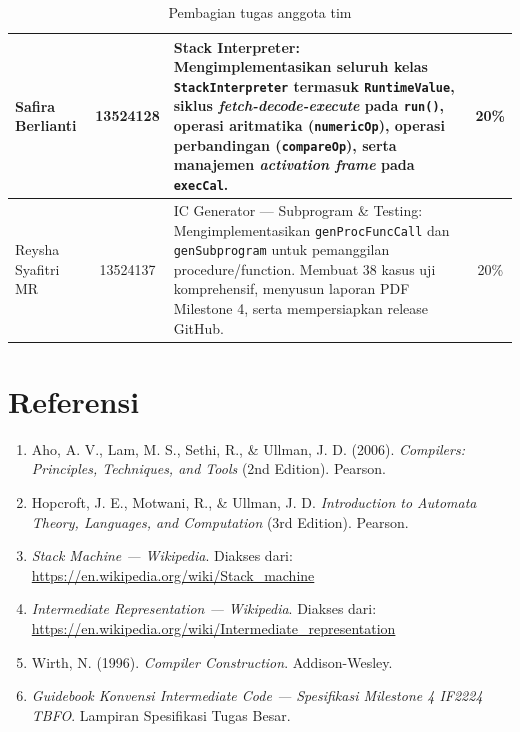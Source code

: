 \documentclass[12pt, a4paper]{article}
\begin{document}
\begin{itemize}
\begin{table}[H]
\begin{tabular}{|p{}|c|p{}|c|}
        Safira Berlianti & 13524128 & 
        Stack Interpreter: Mengimplementasikan seluruh kelas \texttt{StackInterpreter} termasuk \texttt{RuntimeValue}, siklus \textit{fetch-decode-execute} pada \texttt{run()}, operasi aritmatika (\texttt{numericOp}), operasi perbandingan (\texttt{compareOp}), serta manajemen \textit{activation frame} pada \texttt{execCal}.
        & 20\% \\
        \hline
        
        Reysha Syafitri MR & 13524137 & 
        IC Generator --- Subprogram \& Testing: Mengimplementasikan \texttt{genProcFuncCall} dan \texttt{genSubprogram} untuk pemanggilan procedure/function. Membuat 38 kasus uji komprehensif, menyusun laporan PDF Milestone 4, serta mempersiapkan release GitHub.
        & 20\% \\
        \hline
        
    \end{tabular}
    \caption{Pembagian tugas anggota tim}
\end{table}
\end{itemize}

\section{Referensi}

\begin{enumerate}
    \item Aho, A. V., Lam, M. S., Sethi, R., \& Ullman, J. D. (2006). \textit{Compilers: Principles, Techniques, and Tools} (2nd Edition). Pearson.
    
    \item Hopcroft, J. E., Motwani, R., \& Ullman, J. D. \textit{Introduction to Automata Theory, Languages, and Computation} (3rd Edition). Pearson.
    
    \item \textit{Stack Machine --- Wikipedia}. Diakses dari: \url{https://en.wikipedia.org/wiki/Stack_machine}
    
    \item \textit{Intermediate Representation --- Wikipedia}. Diakses dari: \url{https://en.wikipedia.org/wiki/Intermediate_representation}
    
    \item Wirth, N. (1996). \textit{Compiler Construction}. Addison-Wesley.

    \item \textit{Guidebook Konvensi Intermediate Code --- Spesifikasi Milestone 4 IF2224 TBFO}. Lampiran Spesifikasi Tugas Besar.
\end{enumerate}
\end{document}
